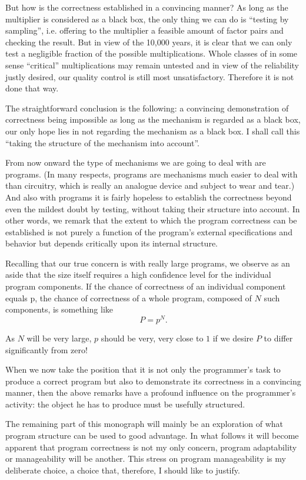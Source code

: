 But how is the correctness established in a convincing manner? As long as the multiplier is considered as a black box, the only thing we can do is ``testing by sampling'', i.e. offering to the multiplier a feasible amount of factor pairs and checking the result. But in view of the 10,000 years, it is clear that we can only test a negligible fraction of the possible multiplications. Whole classes of in some sense ``critical'' multiplications may remain untested and in view of the reliability justly desired, our quality control is still most unsatisfactory. Therefore it is not done that way.

The straightforward conclusion is the following: a convincing demonstration of correctness being impossible as long as the mechanism is regarded
as a black box, our only hope lies in not regarding the mechanism as a black box. I shall call this ``taking the structure of the mechanism into account''.

From now onward the type of mechanisms we are going to deal with are programs. (In many respects, programs are mechanisms much easier to deal
with than circuitry, which is really an analogue device and subject to wear and tear.) And also with programs it is fairly hopeless to establish the correctness beyond even the mildest doubt by testing, without taking their structure into account. In other words, we remark that the extent to which the program correctness can be established is not purely a function of the program's external specifications and behavior but depends critically upon its internal structure.

Recalling that our true concern is with really large programs, we observe as an aside that the size itself requires a high confidence level for the individual program components. If the chance of correctness of an individual component equals p, the chance of correctness of a whole program, composed of $N$ such components, is something like
$$
P=p^N.
$$

As $N$ will be very large, $p$ should be very, very close to $1$ if we desire $P$ to differ significantly from zero!

When we now take the position that it is not only the programmer's task to produce a correct program but also to demonstrate its correctness in a convincing manner, then the above remarks have a profound influence on the programmer's activity: the object he has to produce must be usefully
structured.

The remaining part of this monograph will mainly be an exploration of what program structure can be used to good advantage. In what follows it will become apparent that program correctness is not my only concern, program adaptability or manageability will be another. This stress on program manageability is my deliberate choice, a choice that, therefore, I should like to justify.

